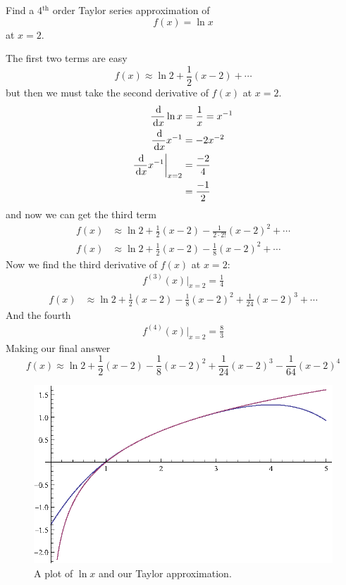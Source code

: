 \begin{ex}
  Find a 4$^\textrm{th}$ order Taylor series approximation of
  \[ f(x) = \ln x \]
  at $x=2$.
  \begin{sol}
    The first two terms are easy
    \[ f(x) \approx \ln{2} + \frac{1}{2} (x-2) + \cdots \]
    but then we must take the second derivative of $f(x)$ at $x=2$.
    \begin{align*}
      \frac{\,\mathrm{d}}{\,\mathrm{d} x} \ln x &= \frac{1}{x} = x^{-1} \\
      \frac{\,\mathrm{d}}{\,\mathrm{d} x} x^{-1} &= -2 x^{-2} \\
      \frac{\,\mathrm{d}}{\,\mathrm{d} x} x^{-1}\bigg|_{x=2}&= \frac{-2}{4} \\
      &= \frac{-1}{2}
    \end{align*}
    and now we can get the third term
    \begin{align*}
      f(x) &\approx \ln{2} + \frac{1}{2} (x-2) - \frac{1}{2\cdot 2!}(x-2)^2 + \cdots \\
      f(x) &\approx \ln{2} + \frac{1}{2} (x-2) - \frac{1}{8}(x-2)^2 + \cdots
    \end{align*}
    Now we find the third derivative of $f(x)$ at $x=2$:
    \begin{align*}
      f^{(3)}(x)\bigg|_{x=2}=\frac{1}{4}
    \end{align*}
    \begin{align*}
      f(x) &\approx \ln{2} + \frac{1}{2} (x-2) - \frac{1}{8}(x-2)^2 + \frac{1}{24}(x-2)^3 + \cdots
    \end{align*}
    And the fourth
    \begin{align*}
      f^{(4)}(x)\bigg|_{x=2}=\frac{8}{3}
    \end{align*}
    Making our final answer
    \[
      f(x) \approx \ln{2} + \frac{1}{2} (x-2) - \frac{1}{8}(x-2)^2 + \frac{1}{24}(x-2)^3 -\frac{1}{64}(x-2)^4
    \]
    \begin{figure}[H]
      \begin{center}
        \includegraphics{continuous/series/lnxtaylor}
      \end{center}
      \caption{A plot of $\ln x$ and our Taylor approximation.}
    \end{figure}
  \end{sol}
\end{ex}
